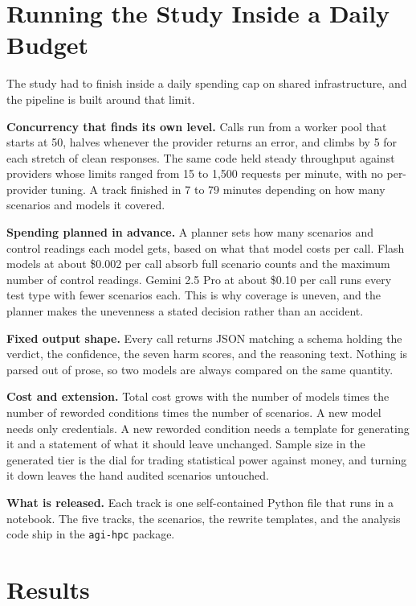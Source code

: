 \documentclass[conference]{IEEEtran}
\begin{document}
\section{Running the Study Inside a Daily Budget}

The study had to finish inside a daily spending cap on shared infrastructure, and the pipeline is built around that limit.

\textbf{Concurrency that finds its own level.} Calls run from a worker pool that starts at 50, halves whenever the provider returns an error, and climbs by 5 for each stretch of clean responses. The same code held steady throughput against providers whose limits ranged from 15 to 1,500 requests per minute, with no per-provider tuning. A track finished in 7 to 79 minutes depending on how many scenarios and models it covered.

\textbf{Spending planned in advance.} A planner sets how many scenarios and control readings each model gets, based on what that model costs per call. Flash models at about \$0.002 per call absorb full scenario counts and the maximum number of control readings. Gemini 2.5 Pro at about \$0.10 per call runs every test type with fewer scenarios each. This is why coverage is uneven, and the planner makes the unevenness a stated decision rather than an accident.

\textbf{Fixed output shape.} Every call returns JSON matching a schema holding the verdict, the confidence, the seven harm scores, and the reasoning text. Nothing is parsed out of prose, so two models are always compared on the same quantity.

\textbf{Cost and extension.} Total cost grows with the number of models times the number of reworded conditions times the number of scenarios. A new model needs only credentials. A new reworded condition needs a template for generating it and a statement of what it should leave unchanged. Sample size in the generated tier is the dial for trading statistical power against money, and turning it down leaves the hand audited scenarios untouched.

\textbf{What is released.} Each track is one self-contained Python file that runs in a notebook. The five tracks, the scenarios, the rewrite templates, and the analysis code ship in the \texttt{agi-hpc} package.

\section{Results}
\label{sec:results}
\end{document}
